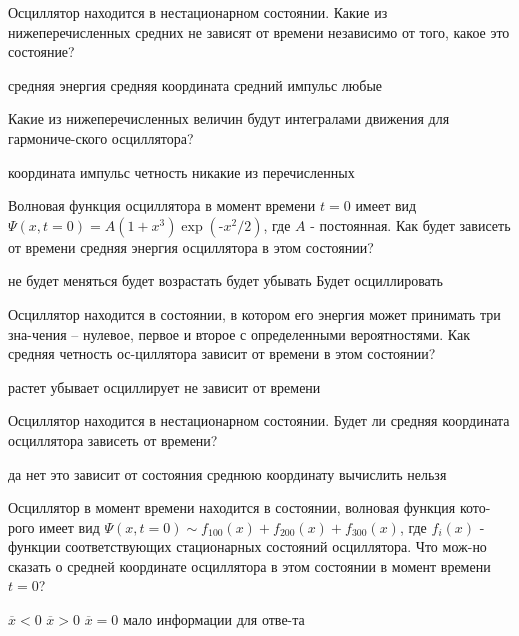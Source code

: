 \documentclass[11pt,a4paper]{exam}
\begin{document}
\begin{questions}
\question Осциллятор находится в нестационарном состоянии. Какие из нижеперечисленных средних не зависят от времени независимо от того, какое это состояние?
\begin{choices}
\choice средняя энергия      
\choice средняя координата
\choice средний импульс      
\choice любые
\end{choices}

\question Какие из нижеперечисленных величин будут интегралами движения для гармониче-ского осциллятора?
\begin{choices}
\choice координата     
\choice импульс
\choice четность       
\choice никакие из перечисленных
\end{choices}

\question Волновая функция осциллятора в момент времени $t=0$ имеет вид $\Psi (x,t=0)=A(1+{{x}^{3}})\exp (\text{-}{{x}^{2}}/2)$, где $A$ - постоянная. Как будет зависеть от времени средняя энергия осциллятора в этом состоянии?
\begin{choices}
\choice не будет меняться       
\choice будет возрастать
\choice будет убывать        
\choice Будет осциллировать
\end{choices}

\question Осциллятор находится в состоянии, в котором его энергия может принимать три зна-чения – нулевое, первое и второе с определенными вероятностями. Как средняя четность ос-циллятора зависит от времени в этом состоянии?
\begin{choices}
\choice растет         
\choice убывает
\choice осциллирует    
\choice не зависит от времени
\end{choices}

\question Осциллятор находится в нестационарном состоянии. Будет ли средняя координата осциллятора зависеть от времени?
\begin{choices}
\choice да             
\choice нет
\choice это зависит от состояния      
\choice среднюю координату вычислить нельзя
\end{choices}

\question Осциллятор в момент времени   находится в состоянии, волновая функция кото-рого имеет вид $\Psi (x,t=0)\sim {{f}_{100}}(x)+{{f}_{200}}(x)+{{f}_{300}}(x)$, где ${{f}_{i}}(x)$ - функции соответствующих стационарных состояний осциллятора. Что мож-но сказать о средней координате осциллятора в этом состоянии в момент времени $t=0$? 
\begin{choices}
\choice $\overline{x}<0$   
\choice $\overline{x}>0$   
\choice $\overline{x}=0$   
\choice мало информации для отве-та
\end{choices}


\end{questions}
\end{document}
